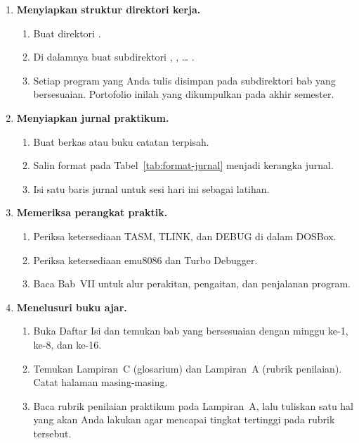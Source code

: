 \begin{enumerate}
    \item \textbf{Menyiapkan struktur direktori kerja.}
    \begin{enumerate}
        \item Buat direktori .
        \item Di dalamnya buat subdirektori
              , , \ldots{} .
        \item Setiap program yang Anda tulis disimpan pada
              subdirektori bab yang bersesuaian. Portofolio inilah
              yang dikumpulkan pada akhir semester.
    \end{enumerate}

    \item \textbf{Menyiapkan jurnal praktikum.}
    \begin{enumerate}
        \item Buat berkas  atau buku catatan
              terpisah.
        \item Salin format pada Tabel~\ref{tab:format-jurnal} menjadi
              kerangka jurnal.
        \item Isi satu baris jurnal untuk sesi hari ini sebagai
              latihan.
    \end{enumerate}

    \item \textbf{Memeriksa perangkat praktik.}
    \begin{enumerate}
        \item Periksa ketersediaan TASM, TLINK, dan DEBUG di dalam
              DOSBox.
        \item Periksa ketersediaan emu8086 dan Turbo Debugger.
        \item Baca Bab~VII untuk alur perakitan, pengaitan, dan
              penjalanan program.
    \end{enumerate}

    \item \textbf{Menelusuri buku ajar.}
    \begin{enumerate}
        \item Buka Daftar Isi dan temukan bab yang bersesuaian dengan
              minggu ke-1, ke-8, dan ke-16.
        \item Temukan Lampiran~C (glosarium) dan Lampiran~A (rubrik
              penilaian). Catat halaman masing-masing.
        \item Baca rubrik penilaian praktikum pada Lampiran~A, lalu
              tuliskan satu hal yang akan Anda lakukan agar mencapai
              tingkat tertinggi pada rubrik tersebut.
    \end{enumerate}


\end{enumerate}
